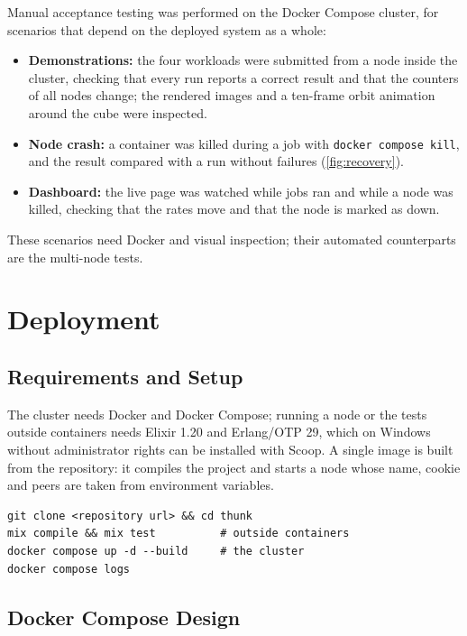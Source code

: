 \documentclass{scrartcl}
\begin{document}
Manual acceptance testing was performed on the Docker Compose cluster, for scenarios that depend on the deployed system as a whole:
%
\begin{itemize}
  \item \textbf{Demonstrations:} the four workloads were submitted from a node inside the cluster, checking that every run reports a correct result and that the counters of all nodes change; the rendered images and a ten-frame orbit animation around the cube were inspected.
  \item \textbf{Node crash:} a container was killed during a job with \texttt{docker compose kill}, and the result compared with a run without failures (\cref{fig:recovery}).
  \item \textbf{Dashboard:} the live page was watched while jobs ran and while a node was killed, checking that the rates move and that the node is marked as down.
\end{itemize}
%
These scenarios need Docker and visual inspection; their automated counterparts are the multi-node tests.

\section{Deployment}\label{deployment}

\subsection{Requirements and Setup}

The cluster needs Docker and Docker Compose; running a node or the tests outside containers needs Elixir 1.20 and Erlang/OTP 29, which on Windows without administrator rights can be installed with Scoop.
%
A single image is built from the repository: it compiles the project and starts a node whose name, cookie and peers are taken from environment variables.
\begin{lstlisting}
git clone <repository url> && cd thunk
mix compile && mix test          # outside containers
docker compose up -d --build     # the cluster
docker compose logs
\end{lstlisting}

\subsection{Docker Compose Design}
\end{document}

